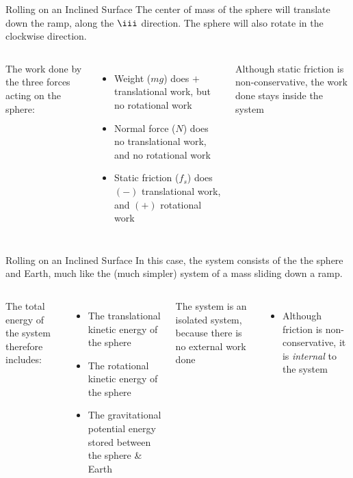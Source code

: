 \documentclass[12pt,compress,aspectratio=169]{beamer}
\begin{document}
\begin{frame}{Rolling on an Inclined Surface}
  The center of mass of the sphere will translate down the ramp, along the
  $\iii$ direction. The sphere will also rotate in the clockwise direction.

  \vspace{.2in}
  \begin{columns}
    

    The work done by the three forces acting on the sphere:
    \begin{itemize}
    \item Weight ($mg$) does $+$ translational work, but no rotational
      work
    \item Normal force ($N$) does no translational work, and no rotational
      work
    \item Static friction ($f_s$) does $(-)$ translational work, and $(+)$
      rotational work
    \end{itemize}
    Although static friction is non-conservative, the work done stays inside
    the system
  \end{columns}    
\end{frame}



\begin{frame}{Rolling on an Inclined Surface}
  In this case, the system consists of the the sphere and Earth, much like the
  (much simpler) system of a mass sliding down a ramp.

  \vspace{.2in}
  \begin{columns}
    

    The total energy of the system therefore includes:
    \begin{itemize}
    \item The translational kinetic energy of the sphere
    \item The rotational kinetic energy of the sphere
    \item The gravitational potential energy stored between the sphere \& Earth
    \end{itemize}
    The system is an isolated system, because there is no external work done
    \begin{itemize}
    \item Although friction is non-conservative, it is \emph{internal} to the
      system
    \end{itemize}
  \end{columns}
\end{frame}
\end{document}
